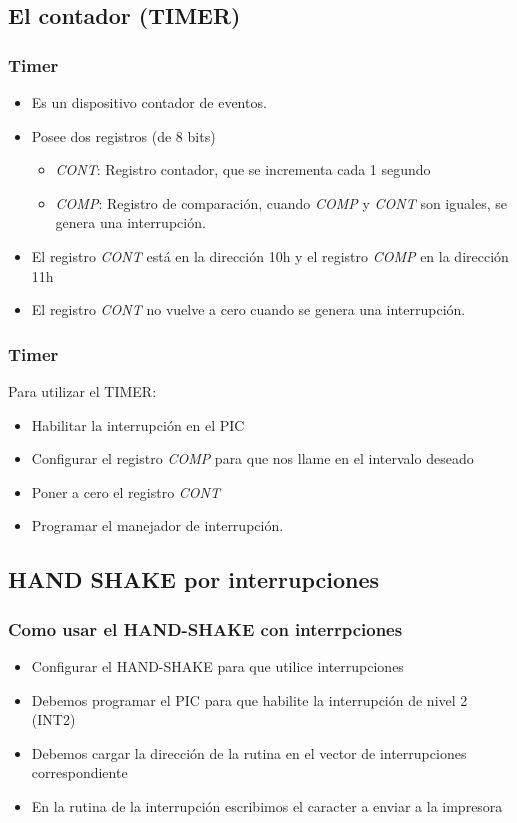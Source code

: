 \documentclass{beamer}
\begin{document}
\subsection{El contador (TIMER)}
\begin{frame}
\frametitle{Timer}
\begin{itemize}
\item Es un dispositivo contador de eventos.
\item Posee dos registros (de 8 bits)
\begin{itemize}
 \item \emph{CONT}: Registro contador, que se incrementa cada 1 segundo
 \item \emph{COMP}: Registro de comparación, cuando \emph{COMP} y \emph{CONT} son iguales, se genera una interrupción.
\end{itemize}
\item El registro \emph{CONT} está en la dirección 10h y el registro \emph{COMP} en la dirección 11h
\item El registro \emph{CONT} no vuelve a cero cuando se genera una interrupción.
\end{itemize}

\end{frame}

\begin{frame}
\frametitle{Timer}
Para utilizar el TIMER:
\begin{itemize}
\item Habilitar la interrupción en el PIC
\item Configurar el registro \emph{COMP} para que nos llame en el intervalo deseado
\item Poner a cero el registro \emph{CONT}
\item Programar el manejador de interrupción.
\end{itemize}

\end{frame}



\subsection{HAND SHAKE por interrupciones}

\begin{frame}[fragile]
\frametitle{Como usar el HAND-SHAKE con interrpciones}
\begin{itemize}
 \item Configurar el HAND-SHAKE para que utilice interrupciones
 \item Debemos programar el PIC para que habilite la interrupción de nivel 2 (INT2)
 \item Debemos cargar la dirección de la rutina en el vector de interrupciones correspondiente
 \item En la rutina de la interrupción escribimos el caracter a enviar a la impresora
\end{itemize}
\end{frame}
\end{document}
